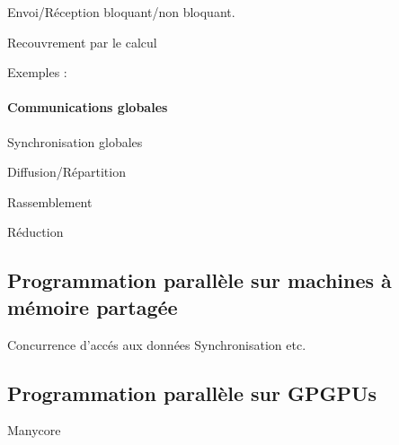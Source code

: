 \documentclass[fleqn,11pt]{article}
\begin{document}
Envoi/Réception bloquant/non bloquant.

Recouvrement par le calcul 

Exemples :

\paragraph{Communications globales}

Synchronisation globales

Diffusion/Répartition

Rassemblement

Réduction


\subsection{Programmation parallèle sur machines à mémoire partagée}

Concurrence d'accés aux données
Synchronisation
etc.

\subsection{Programmation parallèle sur GPGPUs}

Manycore
\end{document}
